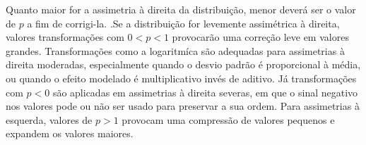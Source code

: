 Quanto maior for a assimetria à direita da distribuição, menor deverá ser
o valor de $p$ a fim de corrigi-la. .Se a distribuição for levemente
assimétrica à direita, valores transformações com $ 0 < p < 1$ provocarão uma
correção leve em valores grandes. Transformações como a logaritmíca são
adequadas para assimetrias à direita moderadas, especialmente quando o desvio
padrão é proporcional à média, ou quando o efeito modelado é multiplicativo
invés de aditivo. Já transformações com $p < 0$ são aplicadas em assimetrias à
direita severas, em que o sinal negativo nos valores pode ou não ser usado para
preservar a sua ordem. Para assimetrias à esquerda, valores de $p > 1$ provocam
uma compressão de valores pequenos e expandem os valores maiores.
